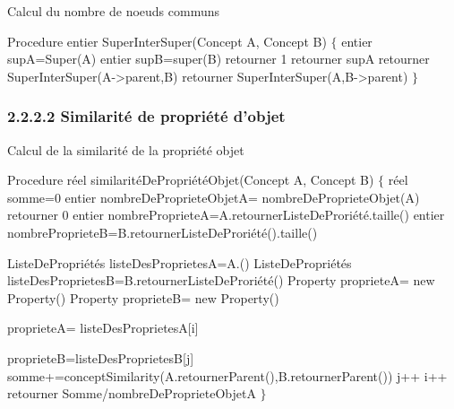 \begin{algorithm}[H]
\caption{ Calcul du nombre de noeuds communs }
\begin{algorithmic}[1]
\State Procedure entier SuperInterSuper(Concept A, Concept B)
\State $\{$
\State entier supA=Super(A)
\State entier supB=super(B)
\State retourner 1
\EndIf
{}
\State retourner supA
\EndIf
{}
\State retourner SuperInterSuper(A->parent,B)
\Else
\State retourner SuperInterSuper(A,B->parent)
\EndIf
\State $\}$
\end{algorithmic}
\end{algorithm}
				
				
        \subsubsection{2.2.2.2 Similarité de propriété d'objet}
		
			\begin{algorithm}[H]
			\caption{ Calcul de la similarité de la propriété objet }
			\begin{algorithmic}[1]
			\State Procedure réel similaritéDePropriétéObjet(Concept A, Concept B)
            \State $\{$
            \State réel somme=0
            \State entier nombreDeProprieteObjetA= nombreDeProprieteObjet(A)
            \State     retourner 0
            \State entier nombreProprieteA=A.retournerListeDeProriété.taille()
            \State entier nombreProprieteB=B.retournerListeDeProriété().taille()

            \State ListeDePropriétés listeDesProprietesA=A.()
		    \State ListeDePropriétés listeDesProprietesB=B.retournerListeDeProriété()
		    \State Property proprieteA= new Property()
		    \State Property proprieteB= new Property()
		
			\State proprieteA= listeDesProprietesA[i]
			
			\State proprieteB=listeDesProprietesB[j]
			\State somme+=conceptSimilarity(A.retournerParent(),B.retournerParent())
            \State j++
			\EndIf
            \EndFor
            \State i++
            \EndFor		
		\EndIf
		\State retourner Somme/nombreDeProprieteObjetA
        \State $\}$
		\end{algorithmic}
\end{algorithm}

